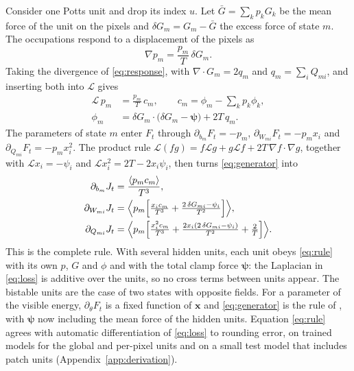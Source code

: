 \documentclass{article}
\newcommand{\x}{\bm{x}}
\newcommand{\gen}{\mathcal{L}}            %
\begin{document}
Consider one Potts unit and drop its index $u$. Let
$\bar G=\sum_k p_kG_k$ be the mean force of the unit on the pixels and
$\delta G_m=G_m-\bar G$ the excess force of state $m$. The occupations respond
to a displacement of the pixels as
\begin{equation}
  \nabla p_m = \frac{p_m}{T}\,\delta G_m .
  \label{eq:response}
\end{equation}
Taking the divergence of \eqref{eq:response}, with
$\nabla\!\cdot G_m=2q_m$ and $q_m=\sum_iQ_{mi}$, and inserting both into
$\gen$ gives
\begin{align}
  \gen\,p_m &= \frac{p_m}{T}\,c_m , \qquad
  c_m = \phi_m-\sum_k p_k\phi_k , \nonumber\\
  \phi_m &= \delta G_m\!\cdot\!\bigl(\delta G_m-\bm{\psi}\bigr) + 2T\,q_m .
  \label{eq:cm}
\end{align}
The parameters of state $m$ enter $F_t$ through
$\partial_{b_m}F_t=-p_m$, $\partial_{W_{mi}}F_t=-p_mx_i$ and
$\partial_{Q_{mi}}F_t=-p_mx_i^{2}$. The product rule
$\gen(fg)=f\gen g+g\gen f+2T\,\nabla f\!\cdot\!\nabla g$, together with
$\gen x_i=-\psi_i$ and $\gen x_i^{2}=2T-2x_i\psi_i$, then turns
\eqref{eq:generator} into
\begin{align}
  \partial_{b_m}J_t &= \frac{\langle p_m c_m\rangle}{T^{3}} , \nonumber\\
  \partial_{W_{mi}}J_t &= \Bigl\langle p_m\Bigl[\tfrac{x_i c_m}{T^{3}}
      + \tfrac{2\,\delta G_{mi}-\psi_i}{T^{2}}\Bigr]\Bigr\rangle , \nonumber\\
  \partial_{Q_{mi}}J_t &= \Bigl\langle p_m\Bigl[\tfrac{x_i^{2}c_m}{T^{3}}
      + \tfrac{2x_i(2\,\delta G_{mi}-\psi_i)}{T^{2}}
      + \tfrac{2}{T}\Bigr]\Bigr\rangle .
  \label{eq:rule}
\end{align}
This is the complete rule. With several hidden units, each unit obeys
\eqref{eq:rule} with its own $p$, $G$ and $\phi$ and with the total clamp
force $\bm{\psi}$: the Laplacian in \eqref{eq:loss} is additive over the units,
so no cross terms between units appear. The bistable units are the case of two
states with opposite fields. For a parameter of the visible energy,
$\partial_\theta F_t$ is a fixed function of $\x$ and \eqref{eq:generator} is
the rule of \citet{firstpaper2025}, with $\bm{\psi}$ now including the mean
force of the hidden units. Equation \eqref{eq:rule} agrees with automatic
differentiation of \eqref{eq:loss} to rounding error, on trained models for
the global and per-pixel units and on a small test model that includes patch
units (Appendix~\ref{app:derivation}).
\end{document}
